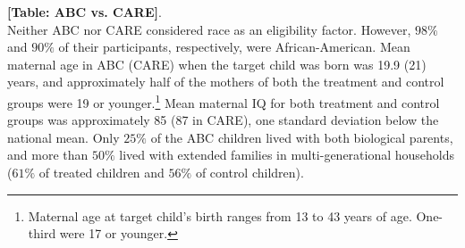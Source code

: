 \noindent \textbf{[Table: ABC vs. CARE]}.\\

\noindent Neither ABC nor CARE considered race as an eligibility factor. However, $98\%$ and $90\%$ of their participants, respectively, were African-American. Mean maternal age in ABC (CARE) when the target child was born was 19.9 (21) years, and approximately half of the mothers of both the treatment and control groups were 19 or younger.\footnote{Maternal age at target child’s birth ranges from 13 to 43 years of age. One-third were 17 or younger.} Mean maternal IQ for both treatment and control groups was approximately 85 (87 in CARE), one standard deviation below the national mean. Only $25\%$ of the ABC children lived with both biological parents, and more than $50\%$ lived with extended families in multi-generational households ($61\%$ of treated children and $56\%$ of control children).\\

